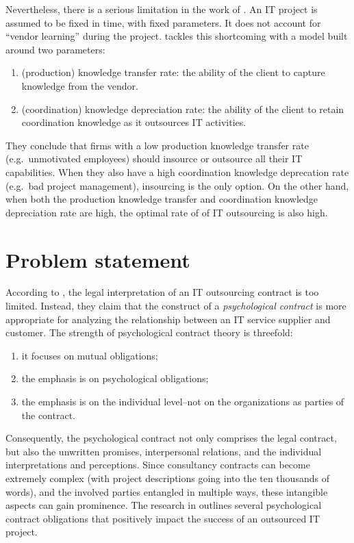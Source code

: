 \documentclass[12pt]{article}
\providecommand{\tightlist}{%
  \setlength{\itemsep}{0pt}\setlength{\parskip}{0pt}}
\begin{document}
Nevertheless, there is a serious limitation in the work of
\citet{nevo2007}. An IT project is assumed to be fixed in time, with
fixed parameters. It does not account for ``vendor learning''
\citep{wu2004} during the project. \citet{cha2009} tackles this
shortcoming with a model built around two parameters:

\begin{enumerate}
\def\labelenumi{\arabic{enumi}.}
\tightlist
\item
  (production) knowledge transfer rate: the ability of the client to
  capture knowledge from the vendor.
\item
  (coordination) knowledge depreciation rate: the ability of the client
  to retain coordination knowledge as it outsources IT activities.
\end{enumerate}

They conclude that firms with a low production knowledge transfer rate
(e.g.~unmotivated employees) should insource or outsource all their IT
capabilities. When they also have a high coordination knowledge
deprecation rate (e.g.~bad project management), insourcing is the only
option. On the other hand, when both the production knowledge transfer
and coordination knowledge depreciation rate are high, the optimal rate
of of IT outsourcing is also high.

\hypertarget{problem-statement}{%
\section{Problem statement}\label{problem-statement}}

According to \citet[357]{ang2004}, the legal interpretation of an IT
outsourcing contract is too limited. Instead, they claim that the
construct of a \emph{psychological contract} is more appropriate for
analyzing the relationship between an IT service supplier and customer.
The strength of psychological contract theory is threefold:

\begin{enumerate}
\def\labelenumi{\arabic{enumi}.}
\tightlist
\item
  it focuses on mutual obligations;
\item
  the emphasis is on psychological obligations;
\item
  the emphasis is on the individual level--not on the organizations as
  parties of the contract.
\end{enumerate}

Consequently, the psychological contract not only comprises the legal
contract, but also the unwritten promises, interpersonal relations, and
the individual interpretations and perceptions. Since consultancy
contracts can become extremely complex (with project descriptions going
into the ten thousands of words), and the involved parties entangled in
multiple ways, these intangible aspects can gain prominence. The
research in \citet[369-70]{ang2004} outlines several psychological
contract obligations that positively impact the success of an outsourced
IT project.
\end{document}
